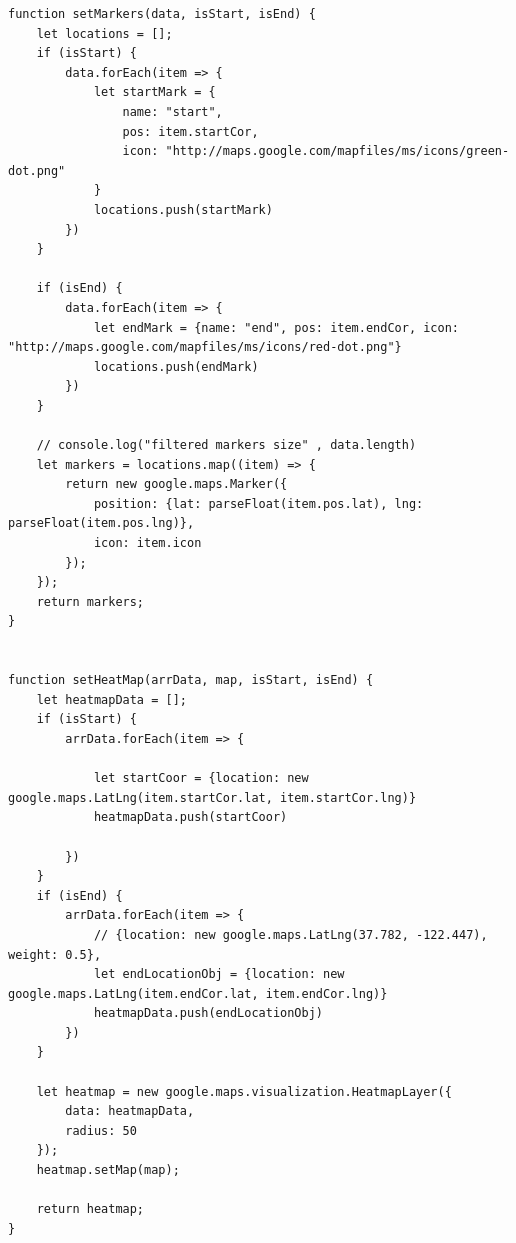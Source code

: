 \begin{lstlisting}[label=map_input , caption=Map Input]
function setMarkers(data, isStart, isEnd) {
    let locations = [];
    if (isStart) {
        data.forEach(item => {
            let startMark = {
                name: "start",
                pos: item.startCor,
                icon: "http://maps.google.com/mapfiles/ms/icons/green-dot.png"
            }
            locations.push(startMark)
        })
    }

    if (isEnd) {
        data.forEach(item => {
            let endMark = {name: "end", pos: item.endCor, icon: "http://maps.google.com/mapfiles/ms/icons/red-dot.png"}
            locations.push(endMark)
        })
    }

    // console.log("filtered markers size" , data.length)
    let markers = locations.map((item) => {
        return new google.maps.Marker({
            position: {lat: parseFloat(item.pos.lat), lng: parseFloat(item.pos.lng)},
            icon: item.icon
        });
    });
    return markers;
}


function setHeatMap(arrData, map, isStart, isEnd) {
    let heatmapData = [];
    if (isStart) {
        arrData.forEach(item => {

            let startCoor = {location: new google.maps.LatLng(item.startCor.lat, item.startCor.lng)}
            heatmapData.push(startCoor)

        })
    }
    if (isEnd) {
        arrData.forEach(item => {
            // {location: new google.maps.LatLng(37.782, -122.447), weight: 0.5},
            let endLocationObj = {location: new google.maps.LatLng(item.endCor.lat, item.endCor.lng)}
            heatmapData.push(endLocationObj)
        })
    }

    let heatmap = new google.maps.visualization.HeatmapLayer({
        data: heatmapData,
        radius: 50
    });
    heatmap.setMap(map);

    return heatmap;
}

\end{lstlisting}